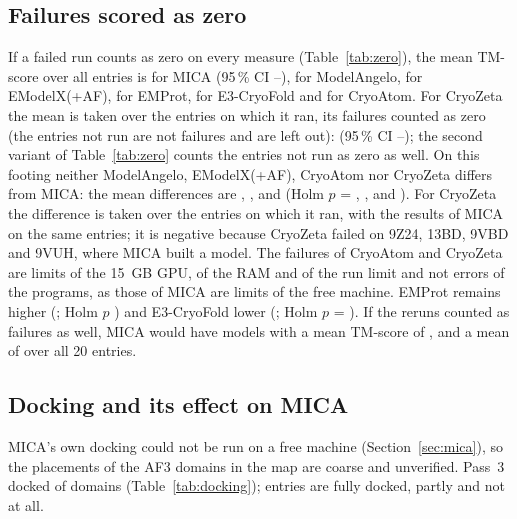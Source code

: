 \subsection{Failures scored as zero}
If a failed run counts as zero on every measure (Table~\ref{tab:zero}), the mean TM-score over all \NEntries{} entries is \ZeroMeanMica{} for MICA (95\,\% CI \ZeroLoMica{}--\ZeroHiMica{}), \ZeroMeanAngelo{} for ModelAngelo, \ZeroMeanEmodelx{} for EModelX(+AF), \ZeroMeanEmprot{} for EMProt, \ZeroMeanEthree{} for E3-CryoFold and \ZeroMeanCryoatom{} for CryoAtom. For CryoZeta the mean is taken over the \ZeroNCryozeta{} entries on which it ran, its \NFailedCryozeta{} failures counted as zero (the entries not run are not failures and are left out): \ZeroMeanCryozeta{} (95\,\% CI \ZeroLoCryozeta{}--\ZeroHiCryozeta{}); the second variant of Table~\ref{tab:zero} counts the entries not run as zero as well. On this footing neither ModelAngelo, EModelX(+AF), CryoAtom nor CryoZeta differs from MICA: the mean differences are \ZeroDiffAngelo{}, \ZeroDiffEmodelx{}, \ZeroDiffCryoatom{} and \ZeroDiffCryozeta{} (Holm $p$ = \ZeroPwHolmAngelo{}, \ZeroPwHolmEmodelx{}, \ZeroPwHolmCryoatom{} and \ZeroPwHolmCryozeta{}). For CryoZeta the difference is taken over the \ZeroNCryozeta{} entries on which it ran, with the results of MICA on the same entries; it is negative because CryoZeta failed on 9Z24, 13BD, 9VBD and 9VUH, where MICA built a model. The failures of CryoAtom and CryoZeta are limits of the 15~GB GPU, of the RAM and of the run limit and not errors of the programs, as those of MICA are limits of the free machine. EMProt remains higher (\ZeroDiffEmprot{}; Holm $p$ \ZeroPwHolmEmprot{}) and E3-CryoFold lower (\ZeroDiffEthree{}; Holm $p$ = \ZeroPwHolmEthree{}). If the \NRerunMica{} reruns counted as failures as well, MICA would have \FirstModels{} models with a mean TM-score of \FirstTmMean{}, and a mean of \FirstZeroMean{} over all 20 entries.

\subsection{Docking and its effect on MICA}\label{sec:dockresults}
MICA's own docking could not be run on a free machine (Section~\ref{sec:mica}), so the placements of the AF3 domains in the map are coarse and unverified. Pass~3 docked \DockDockedThree{} of \DockDomainsThree{} domains (Table~\ref{tab:docking}); \DockModeFull{} entries are fully docked, \DockModePartial{} partly and \DockModeNone{} not at all.

